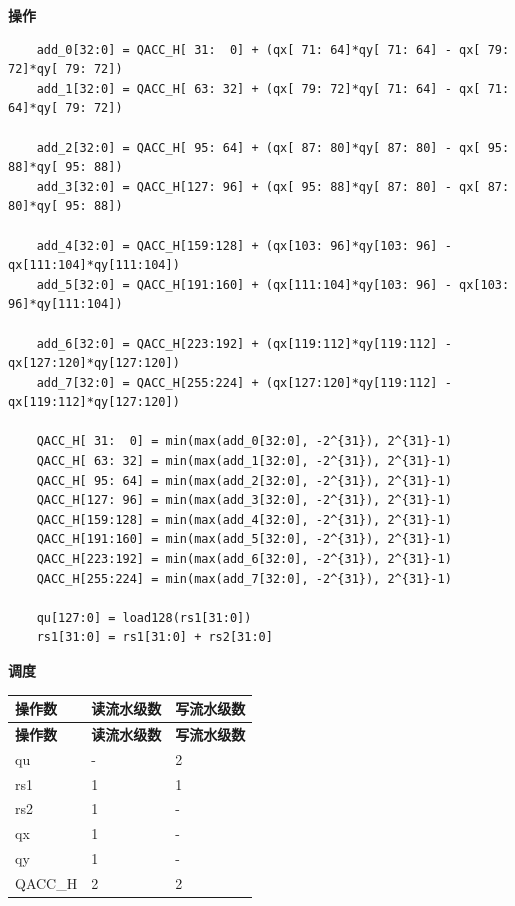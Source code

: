 \textbf{操作}\\
\begin{lstlisting}
    add_0[32:0] = QACC_H[ 31:  0] + (qx[ 71: 64]*qy[ 71: 64] - qx[ 79: 72]*qy[ 79: 72])
    add_1[32:0] = QACC_H[ 63: 32] + (qx[ 79: 72]*qy[ 71: 64] - qx[ 71: 64]*qy[ 79: 72])

    add_2[32:0] = QACC_H[ 95: 64] + (qx[ 87: 80]*qy[ 87: 80] - qx[ 95: 88]*qy[ 95: 88])
    add_3[32:0] = QACC_H[127: 96] + (qx[ 95: 88]*qy[ 87: 80] - qx[ 87: 80]*qy[ 95: 88])

    add_4[32:0] = QACC_H[159:128] + (qx[103: 96]*qy[103: 96] - qx[111:104]*qy[111:104])
    add_5[32:0] = QACC_H[191:160] + (qx[111:104]*qy[103: 96] - qx[103: 96]*qy[111:104])

    add_6[32:0] = QACC_H[223:192] + (qx[119:112]*qy[119:112] - qx[127:120]*qy[127:120])
    add_7[32:0] = QACC_H[255:224] + (qx[127:120]*qy[119:112] - qx[119:112]*qy[127:120])

    QACC_H[ 31:  0] = min(max(add_0[32:0], -2^{31}), 2^{31}-1)
    QACC_H[ 63: 32] = min(max(add_1[32:0], -2^{31}), 2^{31}-1)
    QACC_H[ 95: 64] = min(max(add_2[32:0], -2^{31}), 2^{31}-1)
    QACC_H[127: 96] = min(max(add_3[32:0], -2^{31}), 2^{31}-1)
    QACC_H[159:128] = min(max(add_4[32:0], -2^{31}), 2^{31}-1)
    QACC_H[191:160] = min(max(add_5[32:0], -2^{31}), 2^{31}-1)
    QACC_H[223:192] = min(max(add_6[32:0], -2^{31}), 2^{31}-1)
    QACC_H[255:224] = min(max(add_7[32:0], -2^{31}), 2^{31}-1)

    qu[127:0] = load128(rs1[31:0])
    rs1[31:0] = rs1[31:0] + rs2[31:0]
\end{lstlisting}

\textbf{调度}\\
\begin{longtable}[c]{|l|l|l|}
    \hline
    \rowcolor{lightgray}
    \textbf{操作数} & \textbf{读流水级数} & \textbf{写流水级数} \\\hline
    \endfirsthead
    \hline
    \rowcolor{lightgray}
     \textbf{操作数} & \textbf{读流水级数} & \textbf{写流水级数} \\\hline
    \endhead
    \hline
    \endfoot

    qu & - & 2 \\\hline
    rs1 & 1 & 1 \\\hline
    rs2 & 1 & - \\\hline
     qx & 1 & - \\\hline
     qy & 1 & - \\\hline
     QACC\_H & 2 & 2

\end{longtable}

